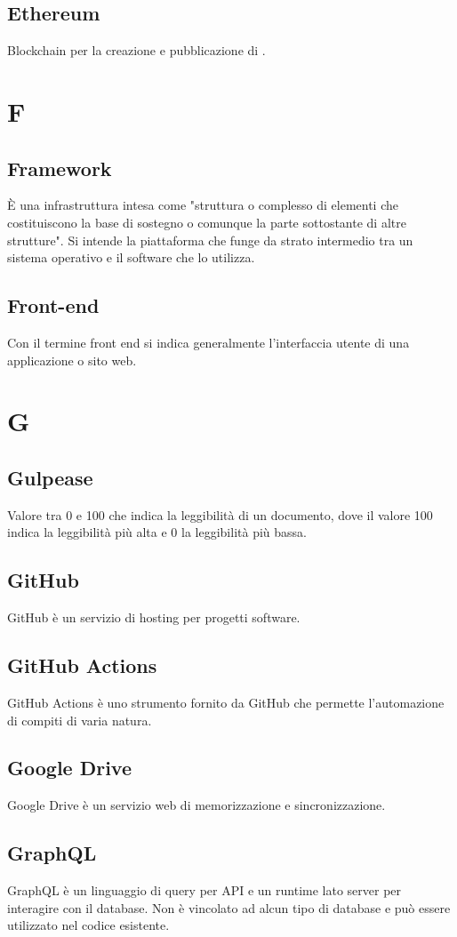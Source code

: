 \subsection{Ethereum} Blockchain per la creazione e pubblicazione di .
\newpage \section{F}
\subsection{Framework} È una infrastruttura intesa come "struttura o complesso di elementi che costituiscono la base di sostegno o comunque la parte sottostante di altre strutture". Si intende la piattaforma che funge da strato intermedio tra un sistema operativo e il software che lo utilizza.
\subsection{Front-end} Con il termine front end si indica generalmente l’interfaccia utente di una applicazione o sito web.
\newpage \section{G}
\subsection{Gulpease} Valore tra 0 e 100 che indica la leggibilità di un documento, dove il valore 100 indica la leggibilità più alta e 0 la leggibilità più bassa. 
\subsection{GitHub} GitHub è un servizio di hosting per progetti software.
\subsection{GitHub Actions} GitHub Actions è uno strumento fornito da GitHub che permette l’automazione di compiti di varia natura.
\subsection{Google Drive} Google Drive è un servizio web di memorizzazione e sincronizzazione.
\subsection{GraphQL} GraphQL è un linguaggio di query per API e un runtime lato server per interagire con il database. Non è vincolato ad alcun tipo di database e può essere utilizzato nel codice esistente.

